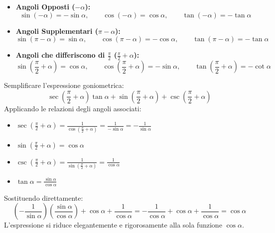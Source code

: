 \documentclass[11pt,a4paper,oneside]{report}
\begin{document}
\begin{metodo}
\begin{itemize}
\item \textbf{Angoli Opposti ($-\alpha$):}
\begin{equation}
\sin(-\alpha) = -\sin\alpha, \qquad \cos(-\alpha) = \cos\alpha, \qquad \tan(-\alpha) = -\tan\alpha
\end{equation}
\item \textbf{Angoli Supplementari ($\pi - \alpha$):}
\begin{equation}
\sin(\pi - \alpha) = \sin\alpha, \qquad \cos(\pi - \alpha) = -\cos\alpha, \qquad \tan(\pi - \alpha) = -\tan\alpha
\end{equation}
\item \textbf{Angoli che differiscono di $\frac{\pi}{2}$ ($\frac{\pi}{2} + \alpha$):}
\begin{equation}
\sin\left(\frac{\pi}{2} + \alpha\right) = \cos\alpha, \qquad \cos\left(\frac{\pi}{2} + \alpha\right) = -\sin\alpha, \qquad \tan\left(\frac{\pi}{2} + \alpha\right) = -\cot\alpha
\end{equation}
\end{itemize}
\end{metodo}

\begin{esempio}
Semplificare l'espressione goniometrica:
\begin{equation}
\sec\left(\frac{\pi}{2} + \alpha\right)\tan\alpha + \sin\left(\frac{\pi}{2} + \alpha\right) + \csc\left(\frac{\pi}{2} + \alpha\right)
\end{equation}
Applicando le relazioni degli angoli associati:
\begin{itemize}
\item $\sec\left(\frac{\pi}{2} + \alpha\right) = \frac{1}{\cos(\frac{\pi}{2} + \alpha)} = \frac{1}{-\sin\alpha} = -\frac{1}{\sin\alpha}$
\item $\sin\left(\frac{\pi}{2} + \alpha\right) = \cos\alpha$
\item $\csc\left(\frac{\pi}{2} + \alpha\right) = \frac{1}{\sin(\frac{\pi}{2} + \alpha)} = \frac{1}{\cos\alpha}$
\item $\tan\alpha = \frac{\sin\alpha}{\cos\alpha}$
\end{itemize}
Sostituendo direttamente:
\begin{equation}
\left(-\frac{1}{\sin\alpha}\right)\left(\frac{\sin\alpha}{\cos\alpha}\right) + \cos\alpha + \frac{1}{\cos\alpha} = -\frac{1}{\cos\alpha} + \cos\alpha + \frac{1}{\cos\alpha} = \cos\alpha
\end{equation}
L'espressione si riduce elegantemente e rigorosamente alla sola funzione $\cos\alpha$.
\end{esempio}
\end{document}
